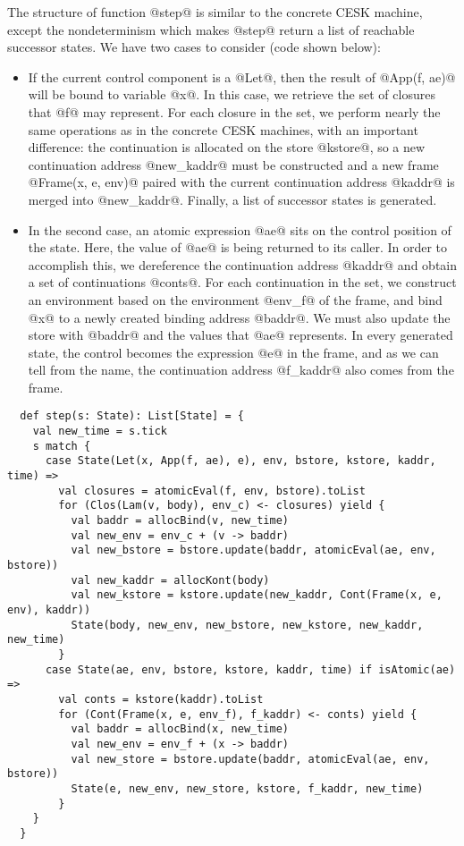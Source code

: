 \documentclass[acmsmall, review]{acmart}\settopmatter{}
\begin{document}
The structure of function @step@ is similar to the concrete CESK machine,
except the nondeterminism which makes @step@ return a list of reachable successor states.
We have two cases to consider (code shown below):

\begin{itemize}
  \item If the current control component is a @Let@, then the result of @App(f, ae)@ will 
    be bound to variable @x@. In this case, we retrieve the set of closures that @f@ may 
    represent. For each closure in the set, we perform nearly the same operations as in the
    concrete CESK machines, with an important difference: the continuation is allocated on 
    the store @kstore@, so a new continuation address @new_kaddr@ must be constructed and 
    a new frame @Frame(x, e, env)@ paired with the current continuation address @kaddr@ is 
    merged into @new_kaddr@. Finally, a list of successor states is generated.

  \item In the second case, an atomic expression @ae@ sits on the control position of the
    state. Here, the value of @ae@ is being returned to its caller.
    In order to accomplish this, we dereference the continuation address @kaddr@ and obtain 
    a set of continuations @conts@. For each continuation in the set, we construct an 
    environment based on the environment @env_f@ of the frame, and bind @x@ to a newly 
    created binding address @baddr@. We must also update the store with @baddr@ and the 
    values that @ae@ represents. In every generated state, the control becomes the expression 
    @e@ in the frame, and as we can tell from the name, the continuation address @f_kaddr@ 
    also comes from the frame.
\end{itemize}

\begin{lstlisting}
  def step(s: State): List[State] = {
    val new_time = s.tick
    s match {
      case State(Let(x, App(f, ae), e), env, bstore, kstore, kaddr, time) =>
        val closures = atomicEval(f, env, bstore).toList
        for (Clos(Lam(v, body), env_c) <- closures) yield {
          val baddr = allocBind(v, new_time)
          val new_env = env_c + (v -> baddr)
          val new_bstore = bstore.update(baddr, atomicEval(ae, env, bstore))
          val new_kaddr = allocKont(body)
          val new_kstore = kstore.update(new_kaddr, Cont(Frame(x, e, env), kaddr))
          State(body, new_env, new_bstore, new_kstore, new_kaddr, new_time)
        }
      case State(ae, env, bstore, kstore, kaddr, time) if isAtomic(ae) =>
        val conts = kstore(kaddr).toList
        for (Cont(Frame(x, e, env_f), f_kaddr) <- conts) yield {
          val baddr = allocBind(x, new_time)
          val new_env = env_f + (x -> baddr)
          val new_store = bstore.update(baddr, atomicEval(ae, env, bstore))
          State(e, new_env, new_store, kstore, f_kaddr, new_time)
        }
    }
  }
\end{lstlisting}
\end{document}

